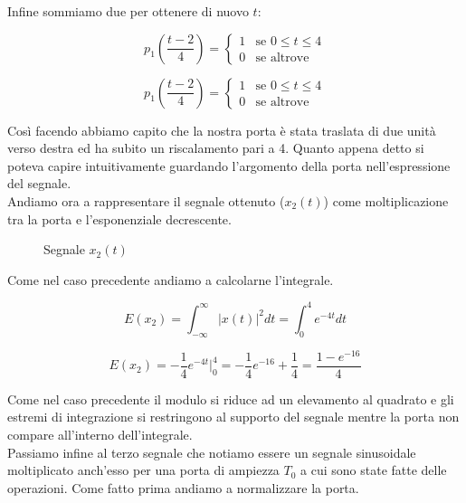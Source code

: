 \documentclass[../main.tex]{subfiles}
\begin{document}
Infine sommiamo due per ottenere di nuovo $t$:

\begin{equation}
	p_1\left(\frac{t-2}{4}\right) = \begin{cases}
    1 & \text{se } 0 \leq t \leq 4 \\
    0 & \text{se altrove}
\end{cases} 
\end{equation}

\begin{equation}
	p_1\left(\frac{t-2}{4}\right) = \begin{cases}
    1 & \text{se } 0 \leq t \leq 4 \\
    0 & \text{se altrove}
\end{cases} 
\end{equation}

Così facendo abbiamo capito che la nostra porta è stata traslata di due unità verso destra ed ha subito un riscalamento pari a 4. Quanto appena detto si poteva capire intuitivamente guardando l'argomento della porta nell'espressione del segnale.\\

Andiamo ora a rappresentare il segnale ottenuto ($x_2(t)$) come moltiplicazione tra la porta e l'esponenziale decrescente.


\begin{figure}[h!]
\begin{center}


\label{fs12}
\caption{Segnale $x_2(t)$}	
\end{center}	
\end{figure}

Come nel caso precedente andiamo a calcolarne l'integrale.

\begin{equation}
	E(x_2) = \int_{-\infty}^{\infty} \big | x(t) \big |^2 dt = \int_{0}^{4} e^{-4t} dt
\end{equation}

\begin{equation}
	 E(x_2) = - \frac{1}{4} e^{-4t} \bigg|_0^4 = - \frac{1}{4} e^{-16} + \frac{1}{4} = \frac{1 - e^{-16}}{4}
\end{equation}

Come nel caso precedente il modulo si riduce ad un elevamento al quadrato e gli estremi di integrazione si restringono al supporto del segnale mentre la porta non compare all'interno dell'integrale.\\

Passiamo infine al terzo segnale che notiamo essere un segnale sinusoidale moltiplicato anch'esso per una porta di ampiezza $T_0$ a cui sono state fatte delle operazioni.
Come fatto prima andiamo a normalizzare la porta.
\end{document}

